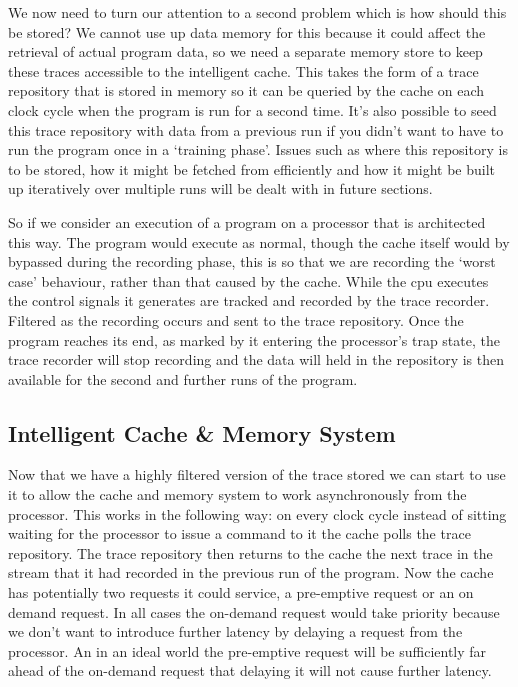 We now need to turn our attention to a second problem which is how should this be stored? We cannot use up data memory for this because it could affect the retrieval of actual program data, so we need a separate memory store to keep these traces accessible to the intelligent cache. This takes the form of a trace repository that is stored in memory so it can be queried by the cache on each clock cycle when the program is run for a second time. It's also possible to seed this trace repository with data from a previous run if you didn't want to have to run the program once in a `training phase'. Issues such as where this repository is to be stored, how it might be fetched from efficiently and how it might be built up iteratively over multiple runs will be dealt with in future sections. 

So if we consider an execution of a program on a processor that is architected this way. The program would execute as normal, though the cache itself would by bypassed during the recording phase, this is so that we are recording the `worst case' behaviour, rather than that caused by the cache. While the \gls{cpu} executes the control signals it generates are tracked and recorded by the trace recorder. Filtered as the recording occurs and sent to the trace repository. Once the program reaches its end, as marked by it entering the processor's trap state, the trace recorder will stop recording and the data will held in the repository is then available for the second and further runs of the program.

\subsection{Intelligent Cache \& Memory System}

Now that we have a highly filtered version of the trace stored we can start to use it to allow the cache and memory system to work asynchronously from the processor. This works in the following way: on every clock cycle instead of sitting waiting for the processor to issue a command to it the cache polls the trace repository. The trace repository then returns to the cache the next trace in the stream that it had recorded in the previous run of the program. Now the cache has potentially two requests it could service, a pre-emptive request or an on demand request. In all cases the on-demand request would take priority because we don't want to introduce further latency by delaying a request from the processor. An in an ideal world the pre-emptive request will be sufficiently far ahead of the on-demand request that delaying it will not cause further latency. 

